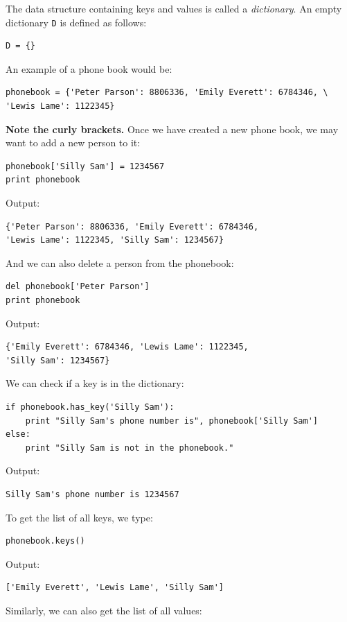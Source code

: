 The data structure containing keys and values is called a {\em dictionary}. 
An empty dictionary {\tt D} is defined as follows:

\begin{verbatim}
D = {}
\end{verbatim}
An example of a phone book would be:

\begin{verbatim}
phonebook = {'Peter Parson': 8806336, 'Emily Everett': 6784346, \
'Lewis Lame': 1122345}
\end{verbatim}
{\bf Note the curly brackets.} 
Once we have created a new phone book, we may want to add a new person to it:

\begin{verbatim}
phonebook['Silly Sam'] = 1234567
print phonebook
\end{verbatim}
Output:

\begin{verbatim}
{'Peter Parson': 8806336, 'Emily Everett': 6784346,
'Lewis Lame': 1122345, 'Silly Sam': 1234567}
\end{verbatim}
And we can also delete a person from the phonebook:

\begin{verbatim}
del phonebook['Peter Parson']
print phonebook
\end{verbatim}
Output:

\begin{verbatim}
{'Emily Everett': 6784346, 'Lewis Lame': 1122345, 
'Silly Sam': 1234567}
\end{verbatim}
We can check if a key is in the dictionary:

\begin{verbatim}
if phonebook.has_key('Silly Sam'):
    print "Silly Sam's phone number is", phonebook['Silly Sam']
else:
    print "Silly Sam is not in the phonebook."
\end{verbatim}
Output:

\begin{verbatim}
Silly Sam's phone number is 1234567
\end{verbatim}
To get the list of all keys, we type:

\begin{verbatim}
phonebook.keys()
\end{verbatim}
Output:

\begin{verbatim}
['Emily Everett', 'Lewis Lame', 'Silly Sam']
\end{verbatim}
Similarly, we can also get the list of all values:


